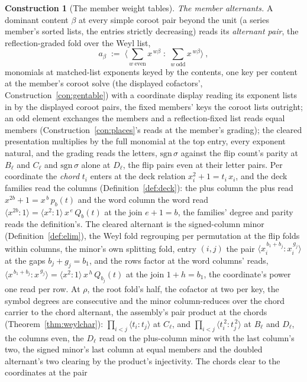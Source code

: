 \documentclass[11pt]{article}
\theoremstyle{definition}
\newtheorem{construction}{Construction}
\begin{document}
\begin{construction}[The member weight tables]
\emph{The member alternants.} A dominant content $\beta$ at
every simple coroot pair beyond the unit (a series member's
sorted lists, the entries strictly decreasing) reads
its \emph{alternant pair}, the reflection-graded fold over the
Weyl list,
\[
a_\beta\;:=\;\Big\langle\sum_{w\ \mathrm{even}}x^{\,w\beta}
\;:\;\sum_{w\ \mathrm{odd}}x^{\,w\beta}\Big\rangle\ ,
\]
monomials at matched-list exponents keyed by the contents, one
key per content at the member's coroot solve (the displayed
cofactors', Construction~\ref{con:gentable}) with a coordinate
display reading its exponent lists in by the displayed coroot
pairs, the fixed members' keys the coroot lists outright; an odd
element exchanges the members and a reflection-fixed list reads
equal members
(Construction~\ref{con:places}'s reads at the member's grading);
the cleared presentation multiplies by the full monomial at the
top entry, every exponent natural, and the grading reads the
letters, $\mathrm{sgn}\,\sigma$ against the flip count's parity
at $B_\ell$ and $C_\ell$ and $\mathrm{sgn}\,\sigma$ alone at
$D_\ell$, the flip pairs even at their letter pairs. Per
coordinate the \emph{chord} $t_i$ enters at the deck relation
$x_i^2+1=t_i\,x_i$, and the deck families read the columns
(Definition~\ref{def:deck}): the plus column the plus read
$x^{2b}+1=x^{\,b}\,p_b(t)$ and the word column the word read
$\langle x^{2b}\!:\!1\rangle=\langle x^2\!:\!1\rangle\,
x^{\,e}\,Q_b(t)$ at the join $e+1=b$, the families' degree and
parity reads the definition's. The cleared alternant is the signed-column minor
(Definition~\ref{def:elim}), the Weyl fold regrouping per
permutation at the flip folds within columns, the minor's own
splitting fold, entry $(i,j)$ the pair
$\langle x_i^{\,b_1+b_j}\!:\!x_i^{\,g_j}\rangle$ at the gaps
$b_j+g_j=b_1$, and the
rows factor at the word columns' reads,
$\langle x^{\,b_1+b_j}\!:\!x^{\,g_j}\rangle
=\langle x^2\!:\!1\rangle\,x^{\,h}\,Q_{b_j}(t)$ at the join
$1+h=b_1$, the
coordinate's power one read per row. At $\rho$, the root fold's
half, the cofactor at two per key, the symbol degrees are
consecutive and the minor column-reduces over the chord carrier
to the chord alternant, the assembly's pair product at the chords
(Theorem~\ref{thm:weylchar}): $\prod_{i<j}\langle
t_i\!:\!t_j\rangle$ at $C_\ell$, and $\prod_{i<j}\langle
t_i^{\,2}\!:\!t_j^{\,2}\rangle$ at $B_\ell$ and $D_\ell$, the
columns even, the $D_\ell$ read on the plus-column minor with the
last column's two, the signed minor's last column at equal
members and the doubled alternant's two clearing by the product's
injectivity. The chords clear to the coordinates at the pair

\end{construction}
\end{document}
